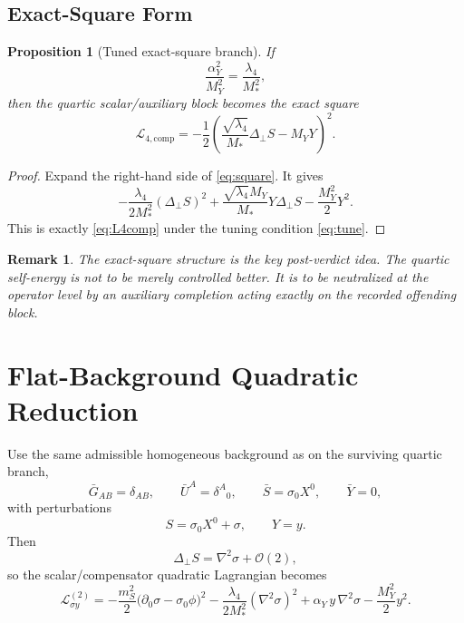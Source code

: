 \documentclass[11pt]{article}
\newtheorem{proposition}{Proposition}
\newtheorem{remark}{Remark}
\begin{document}
\subsection{Exact-Square Form}

\begin{proposition}[Tuned exact-square branch]
\label{prop:square}
If
\begin{equation}
\frac{\alpha_Y^2}{M_Y^2}
=
\frac{\lambda_4}{M_*^2},
\label{eq:tune}
\end{equation}
then the quartic scalar/auxiliary block becomes the exact square
\begin{equation}
\mathcal L_{4,\mathrm{comp}}
=
-\frac{1}{2}
\left(
\frac{\sqrt{\lambda_4}}{M_*}\Delta_\perp S
-M_Y Y
\right)^2.
\label{eq:square}
\end{equation}
\end{proposition}

\begin{proof}
Expand the right-hand side of \eqref{eq:square}. It gives
\[
-\frac{\lambda_4}{2M_*^2}(\Delta_\perp S)^2
+\frac{\sqrt{\lambda_4}M_Y}{M_*}Y\Delta_\perp S
-\frac{M_Y^2}{2}Y^2.
\]
This is exactly \eqref{eq:L4comp} under the tuning condition \eqref{eq:tune}.
\end{proof}

\begin{remark}
The exact-square structure is the key post-verdict idea. The quartic self-energy is not to be merely controlled better. It is to be neutralized at the operator level by an auxiliary completion acting exactly on the recorded offending block.
\end{remark}

\section{Flat-Background Quadratic Reduction}

Use the same admissible homogeneous background as on the surviving quartic branch,
\begin{equation}
\bar G_{AB}=\delta_{AB},
\qquad
\bar U^A=\delta^A{}_0,
\qquad
\bar S=\sigma_0X^0,
\qquad
\bar Y=0,
\label{eq:background}
\end{equation}
with perturbations
\begin{equation}
S=\sigma_0X^0+\sigma,
\qquad
Y=y.
\label{eq:perts}
\end{equation}
Then
\begin{equation}
\Delta_\perp S
=
\nabla^2\sigma+\mathcal O(2),
\label{eq:deltaperpflat}
\end{equation}
so the scalar/compensator quadratic Lagrangian becomes
\begin{equation}
\mathcal L_{\sigma y}^{(2)}
=
-\frac{m_S^2}{2}\bigl(\partial_0\sigma-\sigma_0\phi\bigr)^2
-\frac{\lambda_4}{2M_*^2}(\nabla^2\sigma)^2
+\alpha_Y\,y\,\nabla^2\sigma
-\frac{M_Y^2}{2}y^2.
\label{eq:Lsigmay}
\end{equation}
\end{document}
